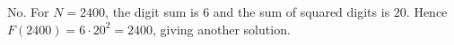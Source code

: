 No. For $N=2400$, the digit sum is $6$ and the sum of squared digits is $20$. Hence $F(2400)=6\cdot20^2=2400$, giving another solution.
